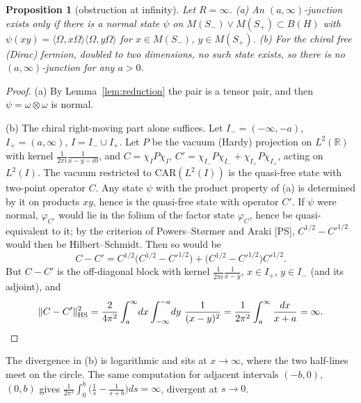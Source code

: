 \documentclass[11pt]{article}
\newtheorem{proposition}[theorem]{Proposition}
\theoremstyle{definition}
\theoremstyle{remark}
\begin{document}
\begin{proposition}[obstruction at infinity]\label{prop:infinity}
Let $R=\infty$. (a) An $(a,\infty)$-junction exists only if there is a normal state $\psi$ on $M(S_-)\vee M(S_+)\subset B(H)$ with $\psi(xy)=\langle\Omega,x\Omega\rangle\langle\Omega,y\Omega\rangle$ for $x\in M(S_-)$, $y\in M(S_+)$. (b) For the chiral free (Dirac) fermion, doubled to two dimensions, no such state exists, so there is no $(a,\infty)$-junction for any $a>0$.
\end{proposition}
\begin{proof}
(a) By Lemma~\ref{lem:reduction} the pair is a tensor pair, and then $\psi=\omega\otimes\omega$ is normal.

(b) The chiral right-moving part alone suffices. Let $I_-=(-\infty,-a)$, $I_+=(a,\infty)$, $I=I_-\cup I_+$. Let $P$ be the vacuum (Hardy) projection on $L^2(\mathbb R)$ with kernel $\frac1{2\pi i}\frac1{x-y-i0}$, and $C=\chi_IP\chi_I$, $C'=\chi_{I_-}P\chi_{I_-}+\chi_{I_+}P\chi_{I_+}$, acting on $L^2(I)$. The vacuum restricted to $\mathrm{CAR}(L^2(I))$ is the quasi-free state with two-point operator $C$. Any state $\psi$ with the product property of (a) is determined by it on products $xy$, hence is the quasi-free state with operator $C'$. If $\psi$ were normal, $\varphi_{C'}$ would lie in the folium of the factor state $\varphi_C$, hence be quasi-equivalent to it; by the criterion of Powers--St{\o}rmer and Araki [PS], $C^{1/2}-C'^{1/2}$ would then be Hilbert--Schmidt. Then so would be
\[
C-C'=C^{1/2}\big(C^{1/2}-C'^{1/2}\big)+\big(C^{1/2}-C'^{1/2}\big)C'^{1/2}.
\]
But $C-C'$ is the off-diagonal block with kernel $\frac1{2\pi i}\frac1{x-y}$, $x\in I_+$, $y\in I_-$ (and its adjoint), and
\[
\|C-C'\|_{\rm HS}^2=\frac2{4\pi^2}\int_a^\infty\!dx\int_{-\infty}^{-a}\!dy\ \frac1{(x-y)^2}=\frac1{2\pi^2}\int_a^\infty\frac{dx}{x+a}=\infty .
\]
\end{proof}
The divergence in (b) is logarithmic and sits at $x\to\infty$, where the two half-lines meet on the circle. The same computation for adjacent intervals $(-b,0)$, $(0,b)$ gives $\frac1{2\pi^2}\int_0^b\big(\frac1s-\frac1{s+b}\big)ds=\infty$, divergent at $s\to0$.
\end{document}
